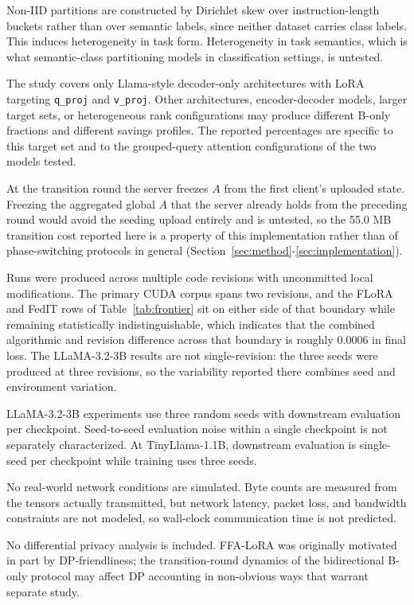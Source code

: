 Non-IID partitions are constructed by Dirichlet skew over instruction-length buckets rather than over semantic labels, since neither dataset carries class labels. This induces heterogeneity in task form. Heterogeneity in task semantics, which is what semantic-class partitioning models in classification settings, is untested.

The study covers only Llama-style decoder-only architectures with LoRA targeting \texttt{q\_proj} and \texttt{v\_proj}. Other architectures, encoder-decoder models, larger target sets, or heterogeneous rank configurations may produce different B-only fractions and different savings profiles. The reported percentages are specific to this target set and to the grouped-query attention configurations of the two models tested.

At the transition round the server freezes $A$ from the first client's uploaded state. Freezing the aggregated global $A$ that the server already holds from the preceding round would avoid the seeding upload entirely and is untested, so the 55.0 MB transition cost reported here is a property of this implementation rather than of phase-switching protocols in general (Section~\ref{sec:method}-\ref{sec:implementation}).

Runs were produced across multiple code revisions with uncommitted local modifications. The primary CUDA corpus spans two revisions, and the FLoRA and FedIT rows of Table~\ref{tab:frontier} sit on either side of that boundary while remaining statistically indistinguishable, which indicates that the combined algorithmic and revision difference across that boundary is roughly 0.0006 in final loss. The LLaMA-3.2-3B results are not single-revision: the three seeds were produced at three revisions, so the variability reported there combines seed and environment variation.

LLaMA-3.2-3B experiments use three random seeds with downstream evaluation per checkpoint. Seed-to-seed evaluation noise within a single checkpoint is not separately characterized. At TinyLlama-1.1B, downstream evaluation is single-seed per checkpoint while training uses three seeds.

No real-world network conditions are simulated. Byte counts are measured from the tensors actually transmitted, but network latency, packet loss, and bandwidth constraints are not modeled, so wall-clock communication time is not predicted.

No differential privacy analysis is included. FFA-LoRA \cite{sun2024ffalora} was originally motivated in part by DP-friendliness; the transition-round dynamics of the bidirectional B-only protocol may affect DP accounting in non-obvious ways that warrant separate study.

